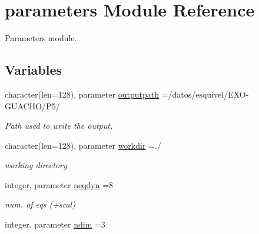 \hypertarget{namespaceparameters}{}\section{parameters Module Reference}
\label{namespaceparameters}


Parameters module.  


\subsection*{Variables}
\begin{DoxyCompactItemize}
\item 
\hypertarget{namespaceparameters_adfc2b2bb3e3f9614e8b171561f9eb78d}{}character(len=128), parameter \hyperlink{namespaceparameters_adfc2b2bb3e3f9614e8b171561f9eb78d}{outputpath} =\textquotesingle{}/datos/esquivel/E\+X\+O-\/G\+U\+A\+C\+H\+O/P5/\textquotesingle{}\label{namespaceparameters_adfc2b2bb3e3f9614e8b171561f9eb78d}

\begin{DoxyCompactList}\small\item\em Path used to write the output. \end{DoxyCompactList}\item 
\hypertarget{namespaceparameters_afe25db26aa30836573528cd959ee1fca}{}character(len=128), parameter \hyperlink{namespaceparameters_afe25db26aa30836573528cd959ee1fca}{workdir} =\textquotesingle{}./\textquotesingle{}\label{namespaceparameters_afe25db26aa30836573528cd959ee1fca}

\begin{DoxyCompactList}\small\item\em working directory \end{DoxyCompactList}\item 
\hypertarget{namespaceparameters_ad2e282b7f56de824d72b1acf9f8aa674}{}integer, parameter \hyperlink{namespaceparameters_ad2e282b7f56de824d72b1acf9f8aa674}{neqdyn} =8\label{namespaceparameters_ad2e282b7f56de824d72b1acf9f8aa674}

\begin{DoxyCompactList}\small\item\em num. of eqs (+scal) \end{DoxyCompactList}\item 
\hypertarget{namespaceparameters_af1edd81ebd6b46141bb93b90084b172e}{}integer, parameter \hyperlink{namespaceparameters_af1edd81ebd6b46141bb93b90084b172e}{ndim} =3\label{namespaceparameters_af1edd81ebd6b46141bb93b90084b172e}


\end{DoxyCompactItemize}
